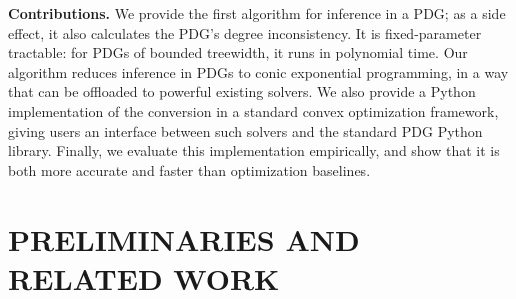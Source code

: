 \documentclass[twoside]{article}
\begin{document}
\textbf{Contributions.}
We provide the first algorithm for inference in a PDG;
    as a side effect, it also calculates the PDG's degree inconsistency. 
It is fixed-parameter tractable: for PDGs of bounded treewidth,
it runs in polynomial time.
Our algorithm reduces inference in PDGs to conic exponential programming,
in a way that can be offloaded to powerful existing solvers.
We also provide a Python implementation of the conversion in a
standard convex optimization framework, giving users an
interface between such solvers and the standard PDG Python library.
Finally, we evaluate this implementation empirically, and show that it is both more accurate and faster than optimization baselines.
%

\section{PRELIMINARIES AND RELATED WORK}
\end{document}
